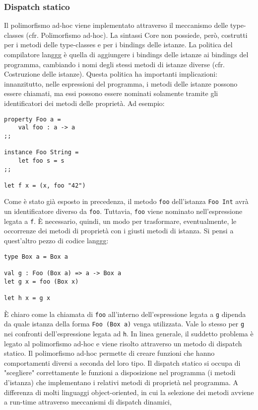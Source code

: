 \documentclass[10pt,a4paper]{article}
\begin{document}
\subsubsection{Dispatch statico}
Il polimorfismo ad-hoc viene implementato attraverso il meccanismo delle type-classes (cfr. Polimorfismo ad-hoc).
La sintassi Core non possiede, però, costrutti per i metodi delle type-classes e per i bindings delle istanze.
La politica del compilatore langgg è quella di aggiungere i bindings delle istanze ai bindings del programma,
cambiando i nomi degli stessi metodi di istanze diverse (cfr. Costruzione delle istanze). Questa politica ha
importanti implicazioni: innanzitutto, nelle espressioni del programma, i metodi delle istanze possono essere chiamati,
ma essi possono essere nominati solamente tramite gli identificatori dei metodi delle proprietà. Ad esempio:
\begin{lstlisting}
property Foo a =
    val foo : a -> a
;;

instance Foo String =
    let foo s = s
;;

let f x = (x, foo "42")
\end{lstlisting}
Come è stato già esposto in precedenza, il metodo \texttt{foo} dell'istanza \texttt{Foo Int} avrà un identificatore
diverso da \texttt{foo}. Tuttavia, \texttt{foo} viene nominato nell'espressione legata a \texttt{f}. \`E necessario,
quindi, un modo per trasformare, eventualmente, le occorrenze dei metodi di proprietà con i giusti metodi di istanza.
Si pensi a quest'altro pezzo di codice langgg:
\begin{lstlisting}
type Box a = Box a

val g : Foo (Box a) => a -> Box a
let g x = foo (Box x)

let h x = g x
\end{lstlisting}
\`E chiaro come la chiamata di \texttt{foo} all'interno dell'espressione legata a \texttt{g} dipenda da quale istanza
della forma \texttt{Foo (Box a)} venga utilizzata. Vale lo stesso per \texttt{g} nei confronti dell'espressione legata
ad \texttt{h}. In linea generale, il suddetto problema è legato al polimorfismo ad-hoc e viene risolto attraverso un
metodo di dispatch statico. Il polimorfismo ad-hoc permette di creare funzioni che hanno comportamenti diversi a
seconda del loro tipo. Il dispatch statico si occupa di "scegliere" correttamente le funzioni a disposizione nel
programma (i metodi d'istanza) che implementano i relativi metodi di proprietà nel programma. A differenza di molti
linguaggi object-oriented, in cui la selezione dei metodi avviene a run-time attraverso meccanismi di dispatch dinamici,
\end{document}
